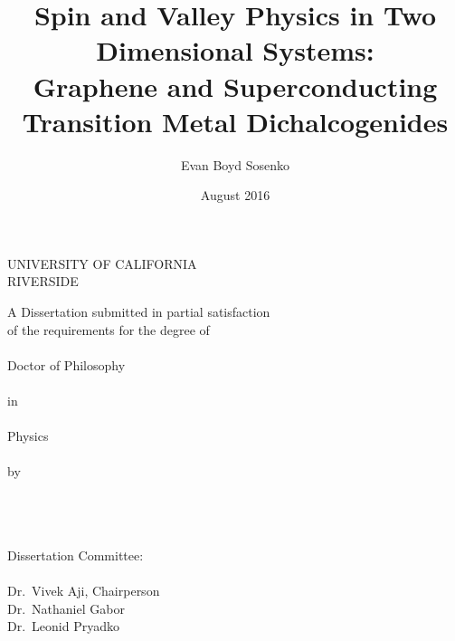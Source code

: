 \title{Spin and Valley Physics in Two Dimensional Systems: \\%
  Graphene and Superconducting Transition Metal Dichalcogenides}
\author{Evan Boyd Sosenko}
\date{August 2016}

\newcommand{\thedegree}{Doctor of Philosophy}
\newcommand{\thefield}{Physics}
\newcommand{\theuniversity}{UNIVERSITY OF CALIFORNIA \\ RIVERSIDE}
\newcommand{\thechair}{Dr.\ Vivek Aji, Chairperson}
\newcommand{\thecommittee}{%
  \indent Dr.\ Vivek Aji, Chairperson \\
  \indent Dr.\ Nathaniel Gabor \\
  \indent Dr.\ Leonid Pryadko
}

\clearpage
\thispagestyle{empty}
\centering
\vspace*{-\toptafiddle}

\vfill

\SingleSpacing{}
\theuniversity{}

\vfill

\thetitle{}

\vfill

A Dissertation submitted in partial satisfaction \\
of the requirements for the degree of
\\~\\
\thedegree{} \\~\\
in \\~\\
\thefield{} \\~\\
by \\~\\
\theauthor{} \\~\\
\thedate{}

\vfill

\justify{}
\SingleSpacing{}
Dissertation Committee: \\
\\
\thecommittee{}

\vfill

\enlargethispage{\bottafiddle}
\clearpage

